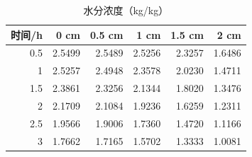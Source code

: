 \begin{table}[htbp]
\centering
\caption{水分浓度（kg/kg）}
\label{tab:q2-4}
\begin{tabular}{rrrrrr}
\hline
时间/h & 0 cm & 0.5 cm & 1 cm & 1.5 cm & 2 cm \\
\hline
0.5 & 2.5499 & 2.5489 & 2.5256 & 2.3257 & 1.6486 \\
1 & 2.5257 & 2.4948 & 2.3578 & 2.0230 & 1.4711 \\
1.5 & 2.3861 & 2.3256 & 2.1344 & 1.8020 & 1.3476 \\
2 & 2.1709 & 2.1084 & 1.9236 & 1.6259 & 1.2311 \\
2.5 & 1.9566 & 1.9006 & 1.7360 & 1.4720 & 1.1166 \\
3 & 1.7662 & 1.7165 & 1.5702 & 1.3333 & 1.0081 \\
\hline
\end{tabular}
\end{table}
